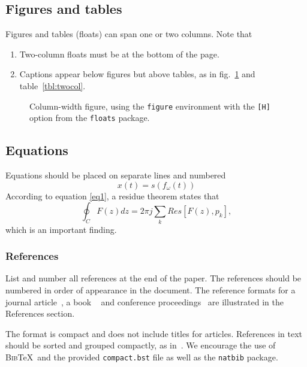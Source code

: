 \documentclass[10pt,a4paper]{article}
\begin{document}
\begin{multicols}{2}
\subsection{Figures and tables} 
Figures and tables (floats) can span one or two columns. Note that
\begin{enumerate}
\item Two-column floats must be at the bottom of the page.
\item Captions appear below figures but above tables, as in
fig.~\ref{fig:single-col} and table~\ref{tbl:twocol}.
\end{enumerate}

\begin{figure}[H]
\centering
\caption{\label{fig:single-col}%
Column-width figure, using the {\tt figure} environment with the {\tt [H]} 
option from the {\tt floats} package.}
\end{figure}

\subsection{Equations}
Equations should be placed on separate lines and numbered
\begin{equation}
x(t) = s(f_\omega(t))
\label{eq1}
\end{equation}
According to equation \ref{eq1}, a residue theorem states that
\begin{equation}
\oint_C F(z)dz=2 \pi j \sum_k Res[F(z),p_k],
\label{eq3}
\end{equation}
which is an important finding.


\subsubsection{References}
List and number all references at the end of the paper. The references should be 
numbered in order of appearance in the document.
The reference formats for a journal article~\cite{Waspaa1}, a book
~\cite{Waspaa2} and conference proceedings~\cite{other} are illustrated in the 
References section. 

The format is compact and does not include titles for 
articles. References in text should be sorted and grouped compactly, as 
in~\cite{Waspaa1,Waspaa2,other}. We encourage the use of \textsc{Bib}\TeX\ and 
the provided {\tt compact.bst} file as well as the {\tt natbib} package.


\end{multicols}
\end{document}

